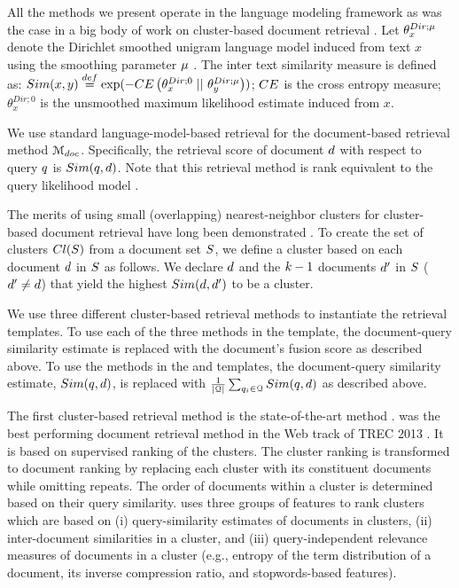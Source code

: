All the methods we present operate in the language modeling framework
as was the case in a big body of work on cluster-based document
retrieval
\cite{Kurland+Lee:04a,Liu+Croft:04a,Kurland+Lee:06a,Liu+Croft:06a,Liu+Croft:06b,Kurland+Domshlak:08a,Kurland:09a,Kurland+Krikon:11a,Raiber+Kurland:13a}. Let
$\theta_x^{Dir; \mu}$ denote the Dirichlet smoothed unigram
language model induced from text $x$ using the smoothing parameter
$\mu$ \cite{Zhai+Lafferty:01a}. The inter text similarity measure is defined as:
$Sim(x,y) \stackrel{def}{=} \exp
(-CE\left(\theta_x^{Dir;0} \; \vert\vert \,\, \theta_y^{Dir;\mu}\right))$; $CE$ is the cross
entropy measure; $\theta_x^{Dir;0}$ is the unsmoothed maximum
likelihood estimate induced from $x$.


We use standard language-model-based retrieval \cite{Lafferty+Zhai:01a} for the document-based retrieval method ${\mathcal M_{doc}}$. Specifically, the retrieval score of document $d$ with respect to query $q$ is $Sim(q,d)$. Note that this retrieval method is rank equivalent to the query likelihood model \cite{Song+Croft:99a}.

 The merits of using small
(overlapping) nearest-neighbor clusters for cluster-based document
retrieval have long been demonstrated
\cite{Kurland+Lee:04a,Kurland+Lee:06a,Liu+Croft:06a,Liu+Croft:06b,Kurland:09a,Raiber+Kurland:13a}. To
create the set of clusters $Cl(S)$ from a document set
$S$, we define a cluster based on each document $d$ in
$S$ as follows. We declare $d$ and the $k-1$ documents $d'$ in $S$ ($d' \ne d$) that yield the highest $Sim(d,d')$ to be a cluster. 

 We use three different
cluster-based retrieval methods to instantiate the retrieval
templates. To use each of the three methods in the \fuseClust template, the document-query similarity estimate is replaced with the document's fusion score as described above. To use the methods in the \poolClust and \feature templates, the document-query similarity estimate, $Sim(q,d)$, is replaced with $\frac{1}{\vert {\mathcal Q} \vert} \sum_{q_i \in {\mathcal Q}} Sim(q,d)$ as described above. 

The first cluster-based retrieval method is the state-of-the-art \clustMRF method
\cite{Raiber+Kurland:13a}. \clustMRF was the best performing document retrieval method in
the Web track of TREC 2013 \cite{Thompson+al:13a}. It is based on supervised ranking of the clusters. The cluster ranking is transformed to document ranking by replacing each cluster with its constituent documents while omitting repeats. The order of documents within a cluster is determined based on their query similarity. \clustMRF uses three groups of features to rank clusters which are based on (i) query-similarity estimates of documents in clusters, (ii) inter-document similarities in a cluster, and (iii) query-independent relevance measures of documents in a cluster (e.g., entropy of the term distribution of a document, its inverse compression ratio, and stopwords-based features).

